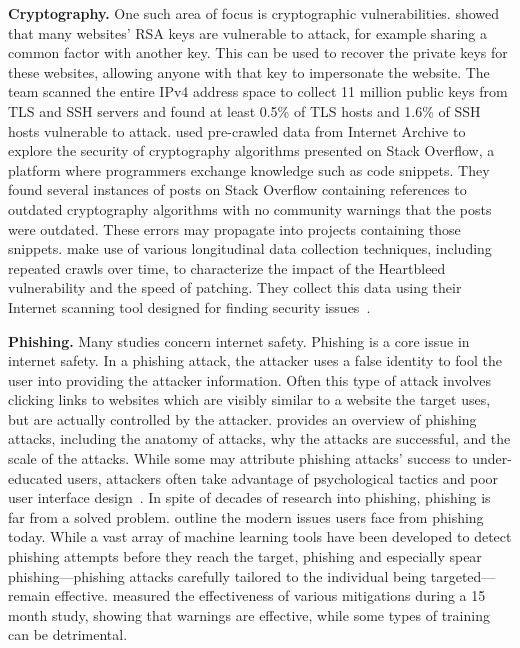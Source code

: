 \textbf{Cryptography.} One such area of focus is cryptographic vulnerabilities. \citet{heninger2012mining} showed that many websites' RSA keys are vulnerable to attack, for example sharing a common factor with another key. This can be used to recover the private keys for these websites, allowing anyone with that key to impersonate the website. The team scanned the entire IPv4 address space to collect 11 million public keys from TLS and SSH servers and found at least 0.5\% of TLS hosts and 1.6\% of SSH hosts vulnerable to attack. \citet{kharche2021study} used pre-crawled data from Internet Archive to explore the security of cryptography algorithms presented on Stack Overflow, a platform where programmers exchange knowledge such as code snippets. They found several instances of posts on Stack Overflow containing references to outdated cryptography algorithms with no community warnings that the posts were outdated. These errors may propagate into projects containing those snippets. \citet{durumeric2014matter} make use of various longitudinal data collection techniques, including repeated crawls over time, to characterize the impact of the Heartbleed vulnerability and the speed of patching. They collect this data using their Internet scanning tool designed for finding security issues~\cite{durumeric2015search}.
 
\textbf{Phishing.}
Many studies concern internet safety. Phishing is a core issue in internet safety. In a phishing attack, the attacker uses a false identity to fool the user into providing the attacker information. Often this type of attack involves clicking links to websites which are visibly similar to a website the target uses, but are actually controlled by the attacker. \citet{hong2012state} provides an overview of phishing attacks, including the anatomy of attacks, why the attacks are successful, and the scale of the attacks. While some may attribute phishing attacks' success to under-educated users, attackers often take advantage of psychological tactics and poor user interface design~\cite{dhamija2006phishing}. In spite of decades of research into phishing, phishing is far from a solved problem. \citet{das2019sok} outline the modern issues users face from phishing today. While a vast array of machine learning tools have been developed to detect phishing attempts before they reach the target, phishing and especially spear phishing---phishing attacks carefully tailored to the individual being targeted---remain effective. \citet{lain2021phishing} measured the effectiveness of various mitigations during a 15 month study, showing that warnings are effective, while some types of training can be detrimental.

